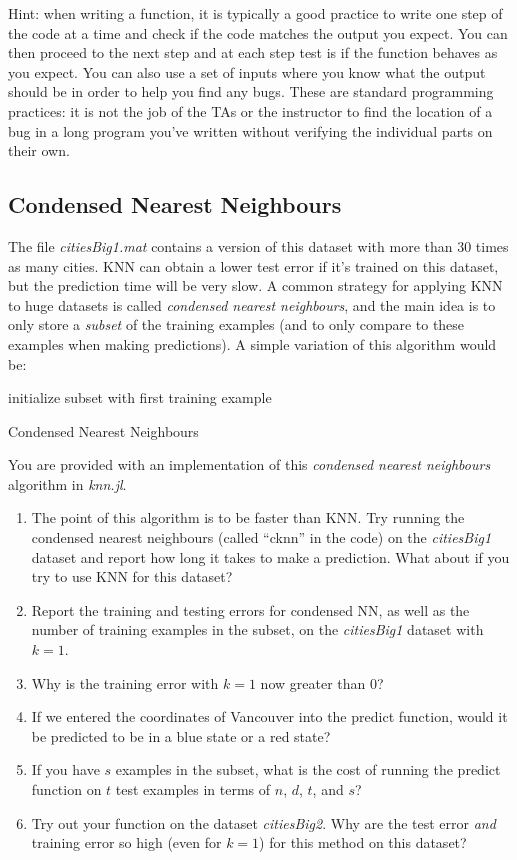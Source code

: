 \documentclass{article}
\def\blu#1{{\color{blu}#1}}
\def\enum#1{\begin{enumerate}#1\end{enumerate}}
\begin{document}
Hint: when writing a function, it is typically a good practice to write one step of the code at a time and check if the code matches the output you expect. You can then proceed to the next step and at each step test is if the function behaves as you expect. You can also use a set of inputs where you know what the output should be in order to help you find any bugs. These are standard programming practices: it is not the job of the TAs or the instructor to find the location of a bug in a long program you've written without verifying the individual parts on their own.

\subsection{Condensed Nearest Neighbours}

The file \emph{citiesBig1.mat} contains a version of this dataset with more than 30 times as many cities. KNN can obtain a lower test error if it's trained on this dataset, but the prediction time will be very slow. A common strategy for applying KNN to huge datasets is called \emph{condensed nearest neighbours}, and the main idea is to only store a \emph{subset} of the training examples (and to only compare to these examples when making predictions). A simple variation of this algorithm would be:

\begin{algorithm}[H]
 initialize subset with first training example\;
 \caption{Condensed Nearest Neighbours}
\end{algorithm}
You are provided with an implementation of this \emph{condensed nearest neighbours} algorithm in \emph{knn.jl}. 
\blu{
\enum{
\item The point of this algorithm is to be faster than KNN. Try running the condensed nearest neighbours (called ``cknn'' in the code) on the \emph{citiesBig1} dataset and report how long it takes to make a prediction. What about if you try to use KNN for this dataset?
\item Report the training and testing errors for condensed NN, as well as the number of training examples in the subset, on the \emph{citiesBig1} dataset with $k=1$.
\item Why is the training error with $k=1$ now greater than $0$?
\item If we entered the coordinates of Vancouver into the predict function, would it be predicted to be in a blue state or a red state?
\item If you have $s$ examples in the subset, what is the cost of running the predict function on $t$ test examples in terms of $n$, $d$, $t$, and $s$?
\item Try out your function on the dataset \emph{citiesBig2}. Why are the  test error \emph{and} training error so high (even for $k=1$) for this method on this dataset?
}
}
\end{document}
